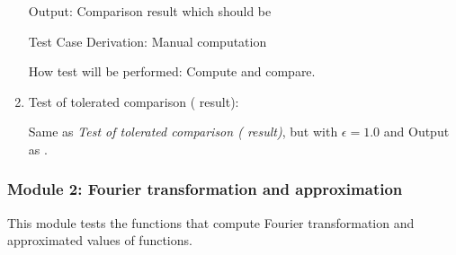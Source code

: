 \documentclass[12pt, titlepage]{article}
\begin{document}
\begin{enumerate}
	Output: Comparison result which should be  
	
	Test Case Derivation: Manual computation
	
	How test will be performed: Compute and compare.
	
	\item{Test of tolerated comparison  ( result):\\}
	
          Same as \textit{Test of tolerated comparison ( result)}, but
          with $\epsilon=1.0$ and Output as .
\end{enumerate}

\subsubsection{Module 2: Fourier transformation and approximation}
This module tests the functions that compute Fourier transformation and
approximated values of functions.
\end{document}
